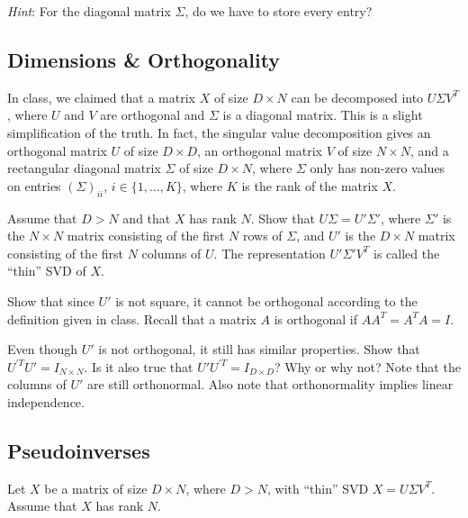 \textit{Hint}: For the diagonal matrix $\Sigma$, do we have to store every entry?

\begin{solution}
\end{solution}

\subsection{Dimensions \& Orthogonality} In class, we claimed that a matrix $X$ of size $D \times N$ can be decomposed into $U\Sigma V^T$, where $U$ and $V$ are orthogonal and $\Sigma$ is a diagonal matrix. This is a slight simplification of the truth. In fact, the singular value decomposition gives an orthogonal matrix $U$ of size $D \times D$, an orthogonal matrix $V$ of size $N \times N$, and a rectangular diagonal matrix $\Sigma$ of size $D \times N$, where $\Sigma$ only has non-zero values on entries $(\Sigma)_{ii}$, $i \in \{1, \ldots, K\}$, where $K$ is the rank of the matrix $X$. 

\problem[3]Assume that $D > N$ and that $X$ has rank $N$. Show that $U\Sigma = U'\Sigma'$, where $\Sigma'$ is the $N \times N$ matrix consisting of the first $N$ rows of $\Sigma$, and $U'$ is the $D \times N$ matrix consisting of the first $N$ columns of $U$. The representation $U'\Sigma' V^T$ is called the ``thin'' SVD of $X$.

\begin{solution}

\end{solution}

\problem[3] Show that since $U'$ is not square, it cannot be orthogonal according to the definition given in class. Recall that a matrix $A$ is orthogonal if $A A^T = A^T A = I$.

\begin{solution}
\end{solution} 

\problem[4] Even though $U'$ is not orthogonal, it still has similar properties. Show that $U^{'T} U' = I_{N \times N}$. Is it also true that $U' U^{'T} = I_{D \times D}$? Why or why not? Note that the columns of $U'$ are still orthonormal. Also note that orthonormality implies linear independence.

\begin{solution}
\end{solution}

\newpage
\subsection{Pseudoinverses} Let $X$ be a matrix of size $D \times N$, where $D > N$, with ``thin'' SVD $X = U\Sigma V^T$. Assume that $X$ has rank $N$.

